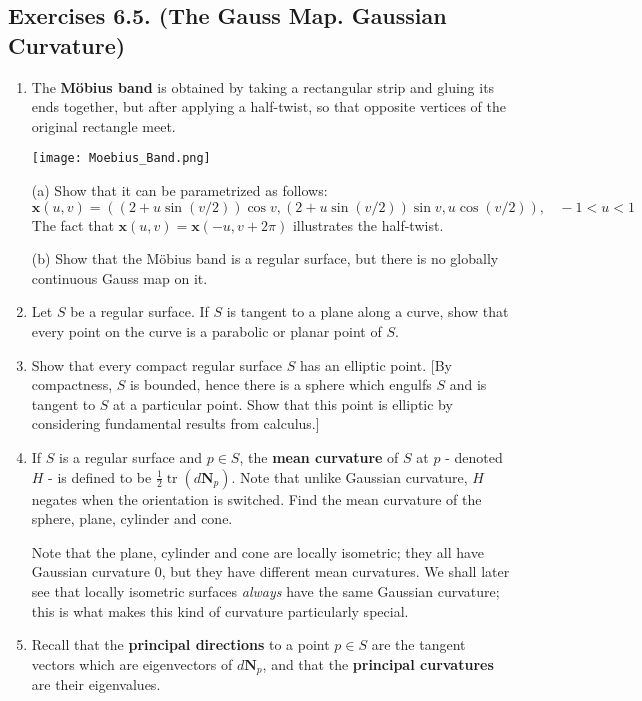 \documentclass[leqno]{book}
\begin{document}
\subsection*{Exercises 6.5. (The Gauss Map.  Gaussian Curvature)}
\begin{enumerate}
\item The \textbf{M\"obius band} is obtained by taking a rectangular strip and gluing its ends together, but after applying a half-twist, so that opposite vertices of the original rectangle meet.
\begin{center}
\texttt{[image: Moebius\_Band.png]}
\end{center}
(a) Show that it can be parametrized as follows:
$$\mathbf x(u,v)=((2+u\sin(v/2))\cos v,(2+u\sin(v/2))\sin v,u\cos(v/2)),~~~~-1<u<1$$
The fact that $\mathbf x(u,v)=\mathbf x(-u,v+2\pi)$ illustrates the half-twist.

(b) Show that the M\"obius band is a regular surface, but there is no globally continuous Gauss map on it.

\item Let $S$ be a regular surface.  If $S$ is tangent to a plane along a curve, show that every point on the curve is a parabolic or planar point of $S$.

\item Show that every compact regular surface $S$ has an elliptic point.  [By compactness, $S$ is bounded, hence there is a sphere which engulfs $S$ and is tangent to $S$ at a particular point.  Show that this point is elliptic by considering fundamental results from calculus.]

\item If $S$ is a regular surface and $p\in S$, the \textbf{mean curvature} of $S$ at $p$ \-- denoted $H$ \-- is defined to be $\frac 12\operatorname{tr}(d\mathbf N_p)$.  Note that unlike Gaussian curvature, $H$ negates when the orientation is switched.  Find the mean curvature of the sphere, plane, cylinder and cone.

Note that the plane, cylinder and cone are locally isometric; they all have Gaussian curvature $0$, but they have different mean curvatures.  We shall later see that locally isometric surfaces \emph{always} have the same Gaussian curvature; this is what makes this kind of curvature particularly special.

\item Recall that the \textbf{principal directions} to a point $p\in S$ are the tangent vectors which are eigenvectors of $d\mathbf N_p$, and that the \textbf{principal curvatures} are their eigenvalues.


\end{enumerate}
\end{document}
